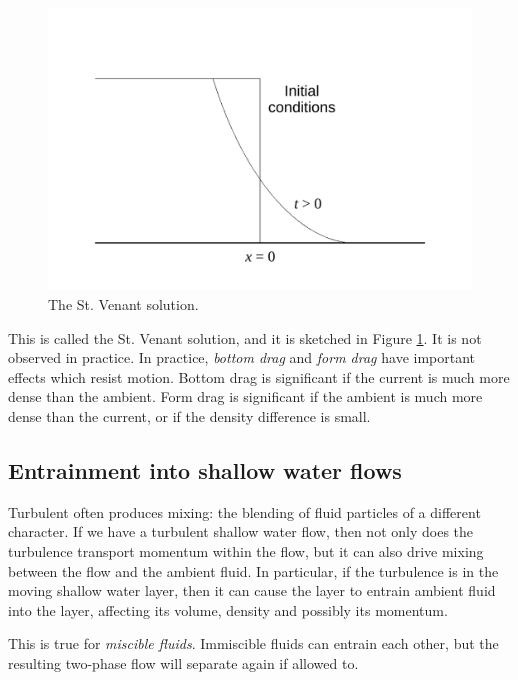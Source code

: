 \begin{figure}
\begin{center}
\includegraphics[width=16cm]{st-venant-solution.pdf}
\caption{The St. Venant solution.}
\label{fig:st-venant-solution}
\end{center}
\end{figure}

This is called the St. Venant solution, and it is sketched in Figure \ref{fig:st-venant-solution}. It is not observed in practice. In practice, \textit{bottom drag} and \textit{form drag} have important effects which resist motion. Bottom drag is significant if the current is much more dense than the ambient. Form drag is significant if the ambient is much more dense than the current, or if the density difference is small.

\subsection{Entrainment into shallow water flows}

Turbulent often produces mixing: the blending of fluid particles of a different character. If we have a turbulent shallow water flow, then not only does the turbulence transport momentum within the flow, but it can also drive mixing between the flow and the ambient fluid. In particular, if the turbulence is in the moving shallow water layer, then it can cause the layer to entrain ambient fluid into the layer, affecting its volume, density and possibly its momentum. 

This is true for \textit{miscible fluids}. Immiscible fluids can entrain each other, but the resulting two-phase flow will separate again if allowed to. 

